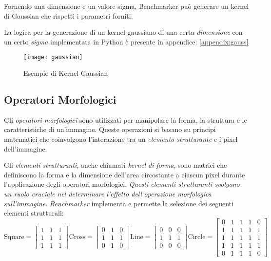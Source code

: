 Fornendo una dimensione e un valore sigma, Benchmarker può generare un kernel di Gaussian che rispetti i parametri forniti.

La logica per la generazione di un kernel gaussiano di una certa \textit{dimensione} con un certo \textit{sigma} implementata in Python è presente in appendice: \ref{appendix:gauss}
\begin{figure}[H]
	\centering
	\texttt{[image: gaussian]}
	\caption{Esempio di Kernel Gaussian}
\end{figure}

\subsection{Operatori Morfologici}
Gli \textit{operatori morfologici} sono utilizzati per manipolare la forma, la struttura e le caratteristiche di un'immagine. Queste operazioni si basano su principi matematici che coinvolgono l'interazione tra un \textit{elemento strutturante} e i pixel dell'immagine.

Gli \textit{elementi strutturanti}, anche chiamati \textit{kernel di forma}, sono matrici che definiscono la forma e la dimensione dell'area circostante a ciascun pixel durante l'applicazione degli operatori morfologici. \textit{Questi elementi strutturanti svolgono un ruolo cruciale nel determinare l'effetto dell'operazione morfologica sull'immagine}.\newline\newline
\noindent\textit{Benchmarker} implementa e permette la selezione dei seguenti elementi strutturali:
\begin{equation*}
	\text {Square} = 
	\begin{bmatrix}
		1 & 1 & 1\\
		1 & 1 & 1\\
		1 & 1 & 1
	\end{bmatrix}
	\text {Cross} = 
	\begin{bmatrix}
		0 & 1 & 0\\
		1 & 1 & 1\\
		0 & 1 & 0
	\end{bmatrix}
	\text {Line} = 
	\begin{bmatrix}
		0 & 0 & 0\\
		1 & 1 & 1\\
		0 & 0 & 0
	\end{bmatrix}
	\text {Circle} = 
	\begin{bmatrix}
		0 & 1 & 1 & 1 & 0\\
		1 & 1 & 1 & 1 & 1\\
		1 & 1 & 1 & 1 & 1\\
		1 & 1 & 1 & 1 & 1\\
		0 & 1 & 1 & 1 & 0
	\end{bmatrix}
\end{equation*}

